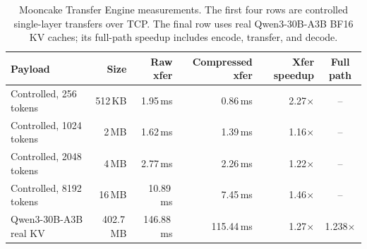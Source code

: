 \begin{table}[t]
\centering
\small
\caption{Mooncake Transfer Engine measurements. The first four rows are controlled single-layer transfers over TCP. The final row uses real Qwen3-30B-A3B BF16 KV caches; its full-path speedup includes encode, transfer, and decode.}
\label{tab:real-kv-mooncake}
\begin{tabularx}{\linewidth}{Xrrrrc}
\toprule
Payload & Size & Raw xfer & Compressed xfer & Xfer speedup & Full path \\
\midrule
Controlled, 256 tokens & 512\,KB & 1.95\,ms & 0.86\,ms & 2.27$\times$ & -- \\
Controlled, 1024 tokens & 2\,MB & 1.62\,ms & 1.39\,ms & 1.16$\times$ & -- \\
Controlled, 2048 tokens & 4\,MB & 2.77\,ms & 2.26\,ms & 1.22$\times$ & -- \\
Controlled, 8192 tokens & 16\,MB & 10.89\,ms & 7.45\,ms & 1.46$\times$ & -- \\
Qwen3-30B-A3B real KV & 402.7\,MB & 146.88\,ms & 115.44\,ms & 1.27$\times$ & 1.238$\times$ \\
\bottomrule
\end{tabularx}
\end{table}
